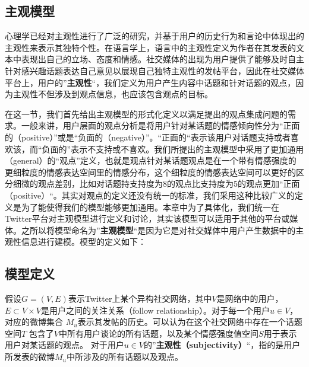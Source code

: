 \begin{landscape}
\section{主观模型}
\label{sec4}
心理学已经对主观性进行了广泛的研究，并基于用户的历史行为和言论中体现出的主观性来表示其独特个性。在语言学上，语言中的主观性定义为作者在其发表的文本中表现出自己的立场、态度和情感。社交媒体的出现为用户提供了能够及时自主针对感兴趣话题表达自己意见以展现自己独特主观性的发帖平台，因此在社交媒体平台上，用户的”\textbf{主观性}“，我们定义为用户产生内容中话题和针对话题的观点，因为主观性不但涉及到观点信息，也应该包含观点的目标。

在这一节，我们首先给出主观模型的形式化定义以满足提出的观点集成问题的需求。一般来讲，用户层面的观点分析是将用户针对某话题的情感倾向性分为“正面的（positive）”或是“负面的（negative）”。“正面的“表示该用户对话题支持或者喜欢该，而“负面的”表示不支持或不喜欢。我们所提出的主观模型中采用了更加通用（general）的“观点”定义，也就是观点针对某话题观点是在一个带有情感强度的更细粒度的情感表达空间里的情感分布，这个细粒度的情感表达空间可以更好的区分细微的观点差别，比如对话题持支持度为8的观点比支持度为5的观点更加“正面（positive）“。其实对观点的定义还没有统一的标准，我们采用这种比较广义的定义是为了能使得我们的模型能够更加通用。本章中为了具体化，我们统一在Twitter平台对主观模型进行定义和讨论，其实该模型可以适用于其他的平台或媒体。之所以将模型命名为”\textbf{主观模型}“是因为它是对社交媒体中用户产生数据中的主观性信息进行建模。模型的定义如下：

\subsection{模型定义}
\label{definition}
假设$G=\left( V,E \right) $表示Twitter上某个异构社交网络，其中$ V $是网络中的用户，$ E\subset V\times V $是用户之间的关注关系（follow relationship）。对于每一个用户$ u \in V $，对应的微博集合 $ M_{u} $表示其发帖的历史。可以认为在这个社交网络中存在一个话题空间$ T $ 包含了$ V $中所有用户谈论的所有话题，以及某个情感强度值空间$ S $用于表示用户对某话题的观点。
对于用户$ u  \in V $的”\textbf{主观性（subjectivity）}“，指的是用户所发表的微博$ M_{u} $中所涉及的所有话题以及观点。
  

\end{landscape}
